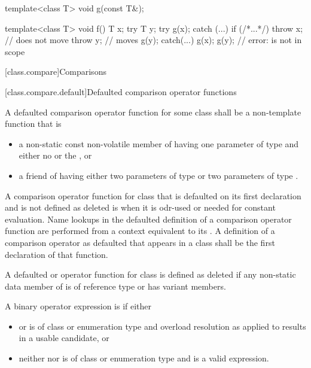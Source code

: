 \pnum
\begin{example}
\begin{codeblock}
template<class T> void g(const T&);

template<class T> void f() {
  T x;
  try {
    T y;
    try { g(x); }
    catch (...) {
      if (/*...*/)
        throw x;        // does not move
      throw y;          // moves
    }
    g(y);
  } catch(...) {
    g(x);
    g(y);               // error:  is not in scope
  }
}
\end{codeblock}
\end{example}

[class.compare]{Comparisons}%

[class.compare.default]{Defaulted comparison operator functions}%

\pnum
A defaulted comparison operator function
for some class 
shall be a non-template function
that is
\begin{itemize}
\item
a non-static const non-volatile member of  having
one parameter of type  and either
no  or
the  \tcode{\&}, or

\item
a friend of  having either
two parameters of type  or
two parameters of type .
\end{itemize}
A comparison operator function for class  that
is defaulted on its first declaration and
is not defined as deleted is
when it is odr-used or needed for constant evaluation.
Name lookups in the defaulted definition
of a comparison operator function
are performed from a context equivalent to
its .
A definition of a comparison operator as
defaulted that appears in a class shall be the first declaration
of that function.

\pnum
A defaulted \tcode{<=>} or \tcode{==} operator function for class 
%
%
is defined as deleted if
any non-static data member of  is of reference type or
 has variant members.

\pnum
A binary operator expression  is
if either

\begin{itemize}
\item
{} or  is of class or enumeration type and
overload resolution as applied to 
results in a usable candidate, or

\item
neither  nor  is of class or enumeration type and
 is a valid expression.
\end{itemize}

